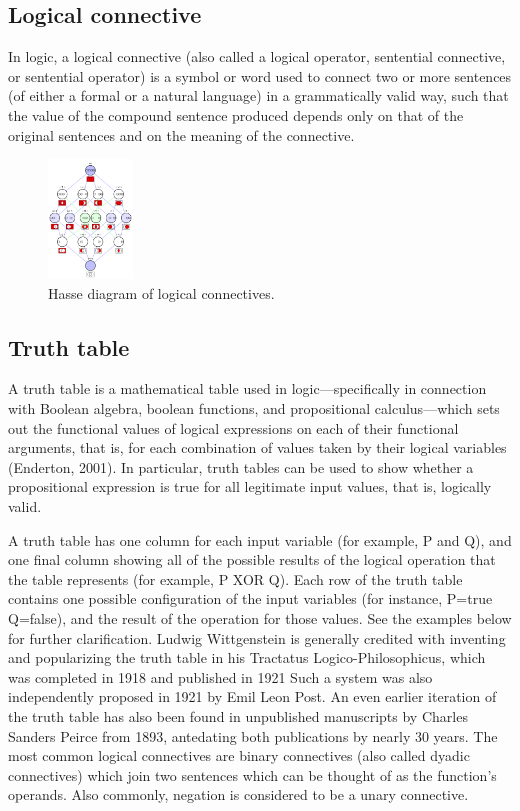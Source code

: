\documentclass{article}
\begin{document}
\subsection{Logical connective}
In logic, a logical connective (also called a logical operator, sentential connective, or sentential operator) is a symbol or word used to connect two or more sentences (of either a formal or a natural language) in a grammatically valid way, such that the value of the compound sentence produced depends only on that of the original sentences and on the meaning of the connective.
\begin{figure}[h]
\includegraphics[width=0.2\textwidth]{smm.png}
\caption{Hasse diagram of logical connectives.}
\end{figure}
\subsection{Truth table}
A truth table is a mathematical table used in logic—specifically in connection with Boolean algebra, boolean functions, and propositional calculus—which sets out the functional values of logical expressions on each of their functional arguments, that is, for each combination of values taken by their logical variables (Enderton, 2001). In particular, truth tables can be used to show whether a propositional expression is true for all legitimate input values, that is, logically valid.

A truth table has one column for each input variable (for example, P and Q), and one final column showing all of the possible results of the logical operation that the table represents (for example, P XOR Q). Each row of the truth table contains one possible configuration of the input variables (for instance, P=true Q=false), and the result of the operation for those values. See the examples below for further clarification. Ludwig Wittgenstein is generally credited with inventing and popularizing the truth table in his Tractatus Logico-Philosophicus, which was completed in 1918 and published in 1921 Such a system was also independently proposed in 1921 by Emil Leon Post. An even earlier iteration of the truth table has also been found in unpublished manuscripts by Charles Sanders Peirce from 1893, antedating both publications by nearly 30 years.
The most common logical connectives are binary connectives (also called dyadic connectives) which join two sentences which can be thought of as the function's operands. Also commonly, negation is considered to be a unary connective.
\end{document}
